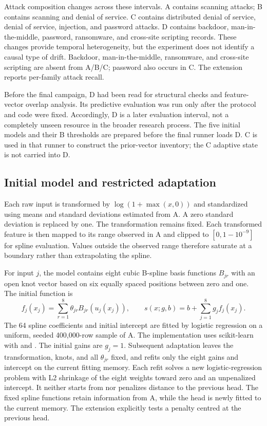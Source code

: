 Attack composition changes across these intervals. A contains scanning attacks; B contains scanning and denial of service. C contains distributed denial of service, denial of service, injection, and password attacks. D contains backdoor, man-in-the-middle, password, ransomware, and cross-site scripting records. These changes provide temporal heterogeneity, but the experiment does not identify a causal type of drift. Backdoor, man-in-the-middle, ransomware, and cross-site scripting are absent from A/B/C; password also occurs in C. The extension reports per-family attack recall.

Before the final campaign, D had been read for structural checks and feature-vector overlap analysis. Its predictive evaluation was run only after the protocol and code were fixed. Accordingly, D is a later evaluation interval, not a completely unseen resource in the broader research process. The five initial models and their B thresholds are prepared before the final runner loads D. C is used in that runner to construct the prior-vector inventory; the C adaptive state is not carried into D.

\subsection{Initial model and restricted adaptation}
Each raw input is transformed by $\log(1+\max(x,0))$ and standardized using means and standard deviations estimated from A. A zero standard deviation is replaced by one. The transformation remains fixed. Each transformed feature is then mapped to its range observed in A and clipped to $[0,1-10^{-9}]$ for spline evaluation. Values outside the observed range therefore saturate at a boundary rather than extrapolating the spline.

For input $j$, the model contains eight cubic B-spline basis functions $B_{jr}$ with an open knot vector based on six equally spaced positions between zero and one. The initial function is
\begin{equation}
 f_j(x_j)=\sum_{r=1}^{8}\theta_{jr}B_{jr}(u_j(x_j)),
 \qquad s(x;g,b)=b+\sum_{j=1}^{8}g_j f_j(x_j).
 \label{eq:model}
\end{equation}
The 64 spline coefficients and initial intercept are fitted by logistic regression on a uniform, seeded 400,000-row sample of A. The implementation uses scikit-learn with  and  \citep{pedregosa2011}. The initial gains are $g_j=1$. Subsequent adaptation leaves the transformation, knots, and all $\theta_{jr}$ fixed, and refits only the eight gains and intercept on the current fitting memory. Each refit solves a new logistic-regression problem with L2 shrinkage of the eight weights toward zero and an unpenalized intercept. It neither starts from nor penalizes distance to the previous head. The fixed spline functions retain information from A, while the head is newly fitted to the current memory. The extension explicitly tests a penalty centred at the previous head.

